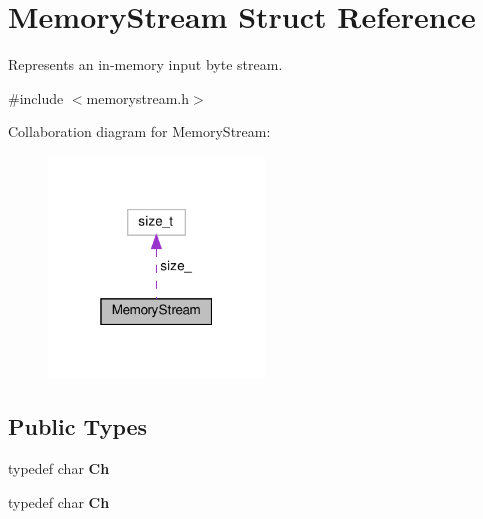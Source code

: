 \hypertarget{structMemoryStream}{}\section{Memory\+Stream Struct Reference}
\label{structMemoryStream}


Represents an in-\/memory input byte stream.  




{\ttfamily \#include $<$memorystream.\+h$>$}



Collaboration diagram for Memory\+Stream\+:
\nopagebreak
\begin{figure}[H]
\begin{center}
\leavevmode
\includegraphics[width=163pt]{structMemoryStream__coll__graph}
\end{center}
\end{figure}
\subsection*{Public Types}
\begin{DoxyCompactItemize}
\item 
\mbox{\label{structMemoryStream_a62a1cbd052c325c83dbdb387d2f89088}} 
typedef char {\bfseries Ch}
\item 
\mbox{\label{structMemoryStream_a62a1cbd052c325c83dbdb387d2f89088}} 
typedef char {\bfseries Ch}
\end{DoxyCompactItemize}
